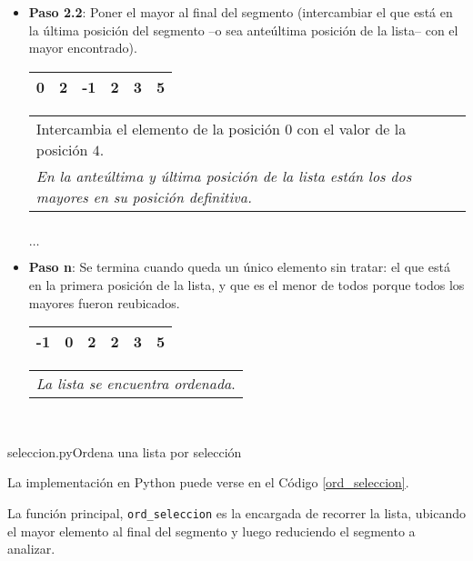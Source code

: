 \begin{itemize}
\item {\bf Paso 2.2}: Poner el mayor al final del segmento (intercambiar el que está en la última
posición del segmento --o sea anteúltima posición de la lista-- con el mayor encontrado). \\

\hspace{0.75cm}
\begin{tabular}[c]{|c|c|c|c|c|c|}
\hline
0& 2&-1&2&3&5\\
\hline
\end{tabular}
\hspace{0.75cm}
\begin{tabular}{p{9cm}}
Intercambia el elemento de la posición $0$ con el valor de la posición $4$. \\
{\it En la anteúltima y última posición de la lista están los dos mayores en su posición definitiva.}
\end{tabular} \\

$\dots$\\

\item {\bf Paso n}: Se termina cuando queda un único elemento sin tratar: el que está
en la primera posición de la lista, y que es el menor de todos porque todos los
mayores fueron reubicados. \\

\hspace{0.75cm}
\begin{tabular}[c]{|c|c|c|c|c|c|}
\hline
-1& 0&2&2&3&5\\
\hline
\end{tabular}
\hspace{0.75cm}
\begin{tabular}{p{9cm}}
{\it La lista se encuentra ordenada}. 
\end{tabular}\\
\end{itemize}

\begin{codigo}{seleccion.py}{Ordena una lista por selección}
\label{ord_seleccion}

\end{codigo}

La implementación en Python puede verse en el Código \ref{ord_seleccion}.


La función principal, \lstinline!ord_seleccion! es la encargada de recorrer
la lista, ubicando el mayor elemento al final del segmento y luego
reduciendo el segmento a analizar.  

